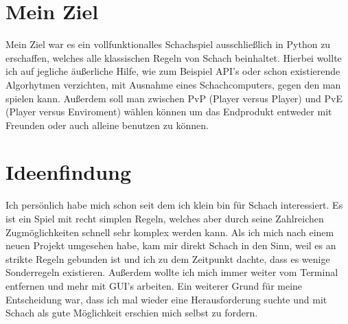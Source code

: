 \documentclass[a4paper, 10pt]{scrartcl}
\begin{document}
\section{Mein Ziel}
Mein Ziel war es ein vollfunktionalles Schachspiel ausschließlich in Python
zu erschaffen, welches alle klassischen Regeln von Schach beinhaltet. 
Hierbei wollte ich auf jegliche äußerliche Hilfe, wie zum Beispiel API's oder schon
existierende Algorhytmen verzichten, mit Ausnahme eines Schachcomputers, gegen den man spielen kann. 
Außerdem soll man zwischen PvP (Player versus Player) und PvE (Player versus Enviroment) wählen können
um das Endprodukt entweder mit Freunden oder auch alleine benutzen zu können.

\section{Ideenfindung}
Ich persönlich habe mich schon seit dem ich klein bin für Schach interessiert.
Es ist ein Spiel mit recht simplen Regeln, welches aber durch seine Zahlreichen Zugmöglichkeiten schnell sehr komplex werden kann.
Als ich mich nach einem neuen Projekt umgesehen habe, kam mir direkt Schach in den Sinn, weil es an strikte Regeln gebunden ist und
ich zu dem Zeitpunkt dachte, dass es wenige Sonderregeln existieren.
Außerdem wollte ich mich immer weiter vom Terminal entfernen und mehr mit
GUI's arbeiten. Ein weiterer Grund für meine Entscheidung war, dass ich mal wieder eine Herausforderung suchte
und mit Schach als gute Möglichkeit erschien mich selbst zu fordern. 
%
\end{document}
